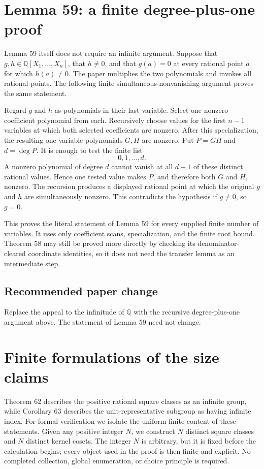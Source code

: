 \documentclass[11pt]{article}
\begin{document}
\section{Lemma 59: a finite degree-plus-one proof}

Lemma 59 itself does not require an infinite argument.  Suppose that
\(g,h\in\mathbb Q[X_1,\ldots,X_n]\), that \(h\ne0\), and that \(g(a)=0\)
at every rational point \(a\) for which \(h(a)\ne0\).  The paper multiplies
the two polynomials and invokes all rational points.  The following finite
simultaneous-nonvanishing argument proves the same statement.

Regard \(g\) and \(h\) as polynomials in their last variable.  Select one
nonzero coefficient polynomial from each.  Recursively choose values for the
first \(n-1\) variables at which both selected coefficients are nonzero.
After this specialization, the resulting one-variable polynomials \(G,H\)
are nonzero.  Put \(P=GH\) and \(d=\deg P\).  It is enough to test the finite
list
\[
 0,1,\ldots,d.
\]
A nonzero polynomial of degree \(d\) cannot vanish at all \(d+1\) of these
distinct rational values.  Hence one tested value makes \(P\), and therefore
both \(G\) and \(H\), nonzero.  The recursion produces a displayed rational
point at which the original \(g\) and \(h\) are simultaneously nonzero.
This contradicts the hypothesis if \(g\ne0\), so \(g=0\).

This proves the literal statement of Lemma 59 for every supplied finite
number of variables.  It uses only coefficient scans, specialization, and the
finite root bound.  Theorem 58 may still be proved more directly by checking
its denominator-cleared coordinate identities, so it does not need the
transfer lemma as an intermediate step.

\subsection{Recommended paper change}

Replace the appeal to the infinitude of \(\mathbb Q\) with the recursive
degree-plus-one argument above.  The statement of Lemma 59 need not change.

\clearpage
\section{Finite formulations of the size claims}

Theorem 62 describes the positive rational square classes as an infinite
group, while Corollary 63 describes the unit-representative subgroup as
having infinite index.  For formal verification we isolate the uniform
finite content of these statements.  Given any positive integer \(N\), we
construct \(N\) distinct square classes and \(N\) distinct kernel cosets.
The integer \(N\) is arbitrary, but it is fixed before the calculation
begins; every object used in the proof is then finite and explicit.  No
completed collection, global enumeration, or choice principle is required.
\end{document}
